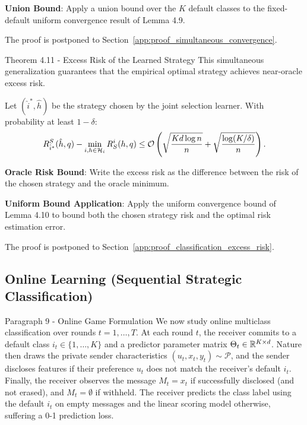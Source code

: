 \begin{guideblock}
\item \textbf{Union Bound}: Apply a union bound over the $K$ default classes to the fixed-default uniform convergence result of Lemma 4.9.
\end{guideblock}
The proof is postponed to Section~\ref{app:proof_simultaneous_convergence}.

\begin{sourceblock}{Theorem 4.11 - Excess Risk of the Learned Strategy}
This simultaneous generalization guarantees that the empirical optimal strategy achieves near-oracle excess risk.
\begin{theorem}
\label{thm:classification_excess_risk}
Let $(\hat{i}^*, \hat{h})$ be the strategy chosen by the joint selection learner. With probability at least $1 - \delta$:
\begin{equation}
    \label{eq:classification_excess_risk}
    R^S_{\hat{i}^*}(\hat{h}, q) - \min_{i, h \in \mathcal{H}_i} R^i_S(h, q) \le \mathcal{O}\left( \sqrt{\frac{K d \log n}{n}} + \sqrt{\frac{\log(K/\delta)}{n}} \right).
\end{equation}
\end{theorem}
\end{sourceblock}

\begin{guideblock}
\item \textbf{Oracle Risk Bound}: Write the excess risk as the difference between the risk of the chosen strategy and the oracle minimum.
\item \textbf{Uniform Bound Application}: Apply the uniform convergence bound of Lemma 4.10 to bound both the chosen strategy risk and the optimal risk estimation error.
\end{guideblock}
The proof is postponed to Section~\ref{app:proof_classification_excess_risk}.

\subsection{Online Learning (Sequential Strategic Classification)}
\label{sec:classification_online}

\begin{sourceblock}{Paragraph 9 - Online Game Formulation}
We now study online multiclass classification over rounds $t = 1, \dots, T$. At each round $t$, the receiver commits to a default class $i_t \in \{1, \dots, K\}$ and a predictor parameter matrix $\Theta_t \in \mathbb{R}^{K \times d}$. Nature then draws the private sender characteristics $(u_t, x_t, y_t) \sim \mathcal{P}$, and the sender discloses features if their preference $u_t$ does not match the receiver's default $i_t$. Finally, the receiver observes the message $M_t = x_t$ if successfully disclosed (and not erased), and $M_t = \emptyset$ if withheld. The receiver predicts the class label using the default $i_t$ on empty messages and the linear scoring model otherwise, suffering a 0-1 prediction loss.
\end{sourceblock}

